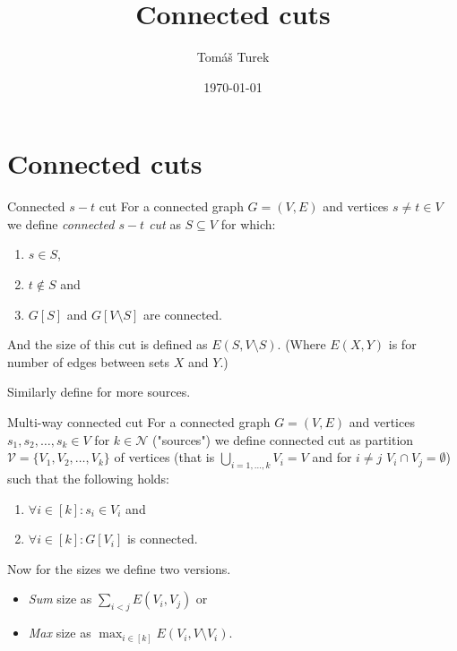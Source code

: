 \documentclass{article}
\title{Connected cuts}
\author{Tomáš Turek}
\date{\today}
\begin{document}
	\maketitle
	
	\section{Connected cuts}
	
	\begin{defn}{Connected $s-t$ cut}
		For a connected graph $G = (V,E)$ and vertices $s \neq t \in V$ we define \textit{connected $s-t$ cut} as $S \subseteq V$ for which:
		
		\begin{enumerate}
			\item $s \in S$,
			\item $t \notin S$ and
			\item $G[S]$ and $G[V \setminus S]$ are connected.
		\end{enumerate}
		
		\noindent And the size of this cut is defined as $E(S, V \setminus S)$. (Where $E(X,Y)$ is for number of edges between sets $X$ and $Y$.)
	\end{defn}
	
	\noindent Similarly define for more sources.
	
	\begin{defn}{Multi-way connected cut}
		For a connected graph $G = (V,E)$ and vertices $s_1, s_2, \dots, s_k \in V$ for $k \in \mathcal{N}$ ("sources") we define connected cut as partition $\mathcal{V} = \{V_1, V_2, \dots, V_k\}$ of vertices (that is $\bigcup_{i = 1, \dots, k} V_i = V$ and for $i \neq j$ $V_i \cap V_j = \emptyset$) such that the following holds:
		
		\begin{enumerate}
			\item $\forall i \in [k]: s_i \in V_i$ and
			\item $\forall i \in [k]: G[V_i]$ is connected.
		\end{enumerate}
		
		\noindent Now for the sizes we define two versions.
		
		\begin{itemize}
			\item \textit{Sum} size as $\sum_{i < j} E(V_i, V_j)$ or
			\item \textit{Max} size as $\max_{i \in[k]} E(V_i, V \setminus V_i)$.
		\end{itemize}
	\end{defn}
	
\end{document}
